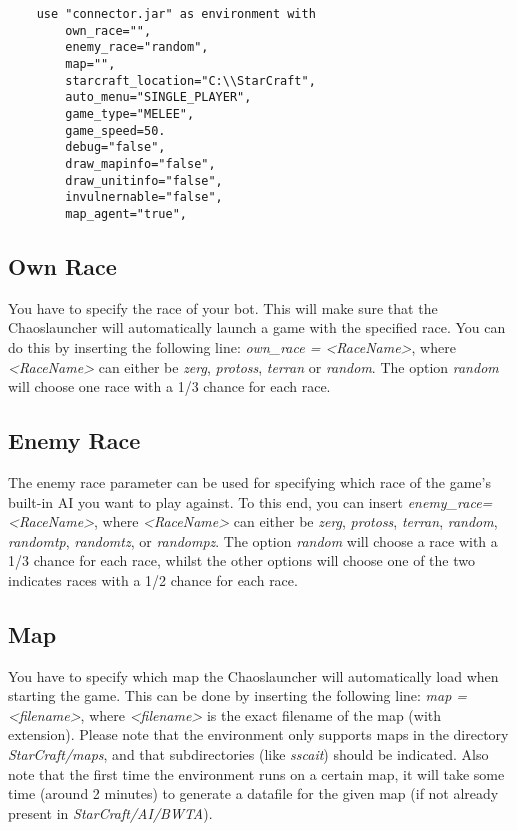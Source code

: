 \begin{verbatim}
    use "connector.jar" as environment with
        own_race="",
        enemy_race="random",
        map="",
        starcraft_location="C:\\StarCraft",
        auto_menu="SINGLE_PLAYER",
        game_type="MELEE",
        game_speed=50.
        debug="false",
        draw_mapinfo="false",
        draw_unitinfo="false",
        invulnernable="false",
        map_agent="true",
\end{verbatim}

\subsection{Own Race}
\label{own race}
You have to specify the race of your bot. This will make sure that the Chaoslauncher will automatically launch a game with the specified race. You can do this by inserting the following line: \textit{own\_race = <RaceName>}, where \textit{<RaceName>} can either be \textit{zerg}, \textit{protoss}, \textit{terran} or \textit{random}. The option \textit{random} will choose one race with a 1/3 chance for each race.

\subsection{Enemy Race}
\label{enemy race}
The enemy race parameter can be used for specifying which race of the game's built-in AI you want to play against. To this end, you can insert \textit{enemy\_race=<RaceName>}, where \textit{<RaceName>} can either be \textit{zerg}, \textit{protoss}, \textit{terran}, \textit{random}, \textit{randomtp}, \textit{randomtz}, or \textit{randompz}. The option \textit{random} will choose a race with a 1/3 chance for each race, whilst the other options will choose one of the two indicates races with a 1/2 chance for each race.

\subsection{Map}
\label{map}
You have to specify which map the Chaoslauncher will automatically load when starting the game. This can be done by inserting the following line: \textit{map = <filename>}, where \textit{<filename>} is the exact filename of the map (with extension). Please note that the environment only supports maps in the directory \textit{StarCraft/maps}, and that subdirectories (like \textit{sscait}) should be indicated. Also note that the first time the environment runs on a certain map, it will take some time (around 2 minutes) to generate a datafile for the given map (if not already present in \textit{StarCraft/AI/BWTA}).

